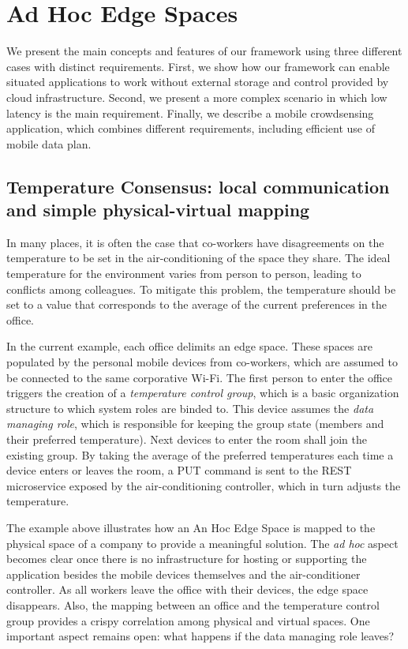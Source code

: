 \section{Ad Hoc Edge Spaces}\label{sec:edge_spaces}

We present the main concepts and features of our framework using three different cases with distinct requirements. First, we show how our framework can enable situated applications to work without external storage and control provided by cloud infrastructure. Second, we present a more complex scenario in which low latency is the main requirement. Finally, we describe a mobile crowdsensing application, which combines different requirements, including efficient use of mobile data plan.

\subsection{Temperature Consensus: local communication and simple physical-virtual mapping}

In many places, it is often the case that co-workers have disagreements on the temperature to be set in the air-conditioning of the space they share. The ideal temperature for the environment varies from person to person, leading to conflicts among colleagues. To mitigate this problem, the temperature should be set to a value that corresponds to the average of the current preferences in the office. 

In the current example, each office delimits an edge space. These spaces are populated by the personal mobile devices from co-workers, which are assumed to be connected to the same corporative Wi-Fi. The first person to enter the office triggers the creation of a \textit{temperature control group}, which is a basic organization structure to which system roles are binded to. This device assumes the \textit{data managing role}, which is responsible for keeping the group state (members and their preferred temperature). Next devices to enter the room shall join the existing group. By taking the average of the preferred temperatures each time a device enters or leaves the room, a PUT command is sent to the REST microservice exposed by the air-conditioning controller, which in turn adjusts the temperature. 

The example above illustrates how an An Hoc Edge Space is mapped to the physical space of a company to provide a meaningful solution. The \textit{ad hoc} aspect becomes clear once there is no infrastructure for hosting or supporting the application besides the mobile devices themselves and the air-conditioner controller. As all workers leave the office with their devices, the edge space disappears. Also, the mapping between an office and the temperature control group provides a crispy correlation among physical and virtual spaces. One important aspect remains open: what happens if the data managing role leaves? 

